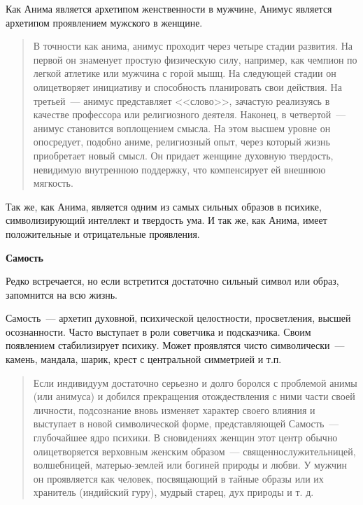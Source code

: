 \documentclass[a4paper,14pt,oneside]{memoir}
\begin{document}
Как Анима является архетипом женственности в мужчине, Анимус является архетипом проявлением мужского в женщине.

\begin{quotation}
В точности как анима, анимус проходит через четыре стадии развития. На первой он знаменует простую физическую силу, например, как чемпион по легкой атлетике или мужчина с горой мышц. На следующей стадии он олицетворяет инициативу и способность планировать свои действия. На третьей~--- анимус представляет <<слово>>, зачастую реализуясь в качестве профессора или религиозного деятеля. Наконец, в четвертой~--- анимус становится воплощением смысла. На этом высшем уровне он опосредует, подобно аниме, религиозный опыт, через который жизнь приобретает новый смысл. Он придает женщине духовную твердость, невидимую внутреннюю поддержку, что компенсирует ей внешнюю мягкость. 
\end{quotation}

Так же, как Анима, является одним из самых сильных образов в психике, символизирующий интеллект и твердость ума. И так же, как Анима, имеет положительные и отрицательные проявления.


\begin{center}
\bfseries{Самость}
\end{center} 

Редко встречается, но если встретится достаточно сильный символ или образ, запомнится на всю жизнь.

Самость~--- архетип духовной, психической целостности, просветления, высшей осознанности. Часто выступает в роли советчика и подсказчика. Своим появлением стабилизирует психику. Может проявлятся чисто символически~--- камень, мандала, шарик, крест с центральной симметрией и т.п.

\begin{quotation}
Если индивидуум достаточно серьезно и долго боролся с проблемой анимы (или анимуса) и добился прекращения отождествления с ними части своей личности, подсознание вновь изменяет характер своего влияния и выступает в новой символической форме, представляющей Самость~--- глубочайшее ядро психики. В сновидениях женщин этот центр обычно олицетворяется верховным женским образом~--- священнослужительницей, волшебницей, матерью-землей или богиней природы и любви. У мужчин он проявляется как человек, посвящающий в тайные образы или их хранитель (индийский гуру), мудрый старец, дух природы и т. д. 
\end{quotation}
\end{document}
